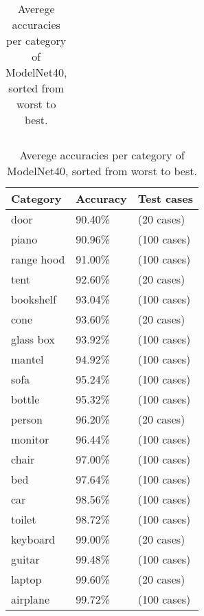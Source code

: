 \begin{table}[]
\begin{tabular}[t]{lll}
	\end{tabular}
	\begin{tabular}[t]{lll}
		\hline
		\textbf{Category} & \textbf{Accuracy} & \textbf{Test cases} \\ \hline
		door              & 90.40\%        & (20 cases)    \\
		piano             & 90.96\%        & (100 cases)   \\
		range hood        & 91.00\%        & (100 cases)   \\
		tent              & 92.60\%        & (20 cases)    \\
		bookshelf         & 93.04\%        & (100 cases)   \\
		cone              & 93.60\%        & (20 cases)    \\
		glass box         & 93.92\%        & (100 cases)   \\
		mantel            & 94.92\%        & (100 cases)   \\
		sofa              & 95.24\%        & (100 cases)   \\
		bottle            & 95.32\%        & (100 cases)   \\
		person            & 96.20\%        & (20 cases)    \\
		monitor           & 96.44\%        & (100 cases)   \\
		chair             & 97.00\%        & (100 cases)   \\
		bed               & 97.64\%        & (100 cases)   \\
		car               & 98.56\%        & (100 cases)   \\
		toilet            & 98.72\%        & (100 cases)   \\
		keyboard          & 99.00\%        & (20 cases)    \\
		guitar            & 99.48\%        & (100 cases)   \\
		laptop            & 99.60\%        & (20 cases)    \\
		airplane          & 99.72\%        & (100 cases)
	\end{tabular}
	
	
	\caption{Averege accuracies per category of ModelNet40, sorted from worst to best.}
	\label{Table:cataccuracies}
\end{table}